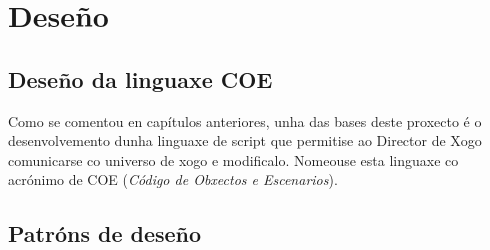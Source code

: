 \chapter{Deseño}
\label{ch:desenho}
\section{Deseño da linguaxe COE}
Como se comentou en capítulos anteriores, unha das bases deste proxecto é o
desenvolvemento dunha linguaxe de script que permitise ao Director de Xogo
comunicarse co universo de xogo e modificalo. Nomeouse esta linguaxe co acrónimo
de COE ({\it Código de Obxectos e Escenarios}).

\section{Patróns de deseño}